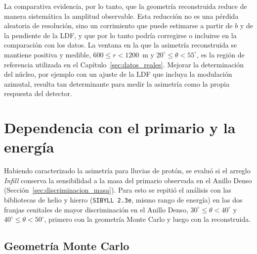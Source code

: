 {\leavevmode\color{blue}La comparativa evidencia, por lo tanto, que la geometría reconstruida reduce de manera sistemática la amplitud observable. Esta reducción no es una pérdida aleatoria de resolución, sino un corrimiento que puede estimarse a partir de $b$ y de la pendiente de la LDF, y que por lo tanto podría corregirse o incluirse en la comparación con los datos. La ventana en la que la asimetría reconstruida se mantiene positiva y medible, $600 \leq r < 1200$~m y $20^\circ \leq \theta < 55^\circ$, es la región de referencia utilizada en el Capítulo~\ref{sec:datos_reales}. Mejorar la determinación del núcleo, por ejemplo con un ajuste de la LDF que incluya la modulación azimutal, resulta tan determinante para medir la asimetría como la propia respuesta del detector.}

\section{Dependencia con el primario y la energía}
\label{sec:infill_masa}

{\leavevmode\color{blue}Habiendo caracterizado la asimetría para lluvias de protón, se evaluó si el arreglo \textit{Infill} conserva la sensibilidad a la masa del primario observada en el Anillo Denso (Sección~\ref{sec:discriminacion_masa}). Para esto se repitió el análisis con las bibliotecas de helio y hierro (\texttt{SIBYLL 2.3e}, mismo rango de energía) en las dos franjas cenitales de mayor discriminación en el Anillo Denso, $30^\circ \leq \theta < 40^\circ$ y $40^\circ \leq \theta < 50^\circ$, primero con la geometría Monte Carlo y luego con la reconstruida.}

\subsection{Geometría Monte Carlo}

